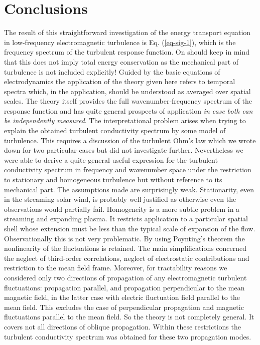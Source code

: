\documentclass[ ]{copernicus2}
\begin{document}
{{{\section{Conclusions}
{The result of this straightforward investigation of the energy transport equation in low-frequency electromagnetic turbulence is Eq. (\ref{eq-sig-1}), which is the frequency spectrum of the turbulent response function. On should keep in mind that this does not imply total energy conservation as the mechanical part of turbulence is not included explicitly! Guided by the basic equations of electrodynamics the application of the theory given here refers to temporal spectra which, in the application, should be understood as averaged over spatial scales. The theory itself provides the full wavenumber-frequency spectrum of the response function and has quite general prospects of application \emph{in case both can be independently measured}. The interpretational problem arises when trying to explain the obtained turbulent conductivity spectrum by some model of turbulence. This requires a discussion of the turbulent Ohm's law which we wrote down for two particular cases but did not investigate further. Nevertheless we were able to derive a quite general useful expression for the turbulent conductivity spectrum in frequency and wavenumber space under the restriction to stationary and homogeneous turbulence but without reference to its mechanical part. The assumptions made are surprisingly weak. Stationarity, even in the streaming solar wind, is probably well justified as otherwise even the observations would partially fail. Homogeneity is a more subtle problem in a streaming and expanding plasma. It restricts application to a particular spatial shell whose extension must be less than the typical scale of expansion of the flow. Observationally this is not very problematic. By using Poynting's theorem the nonlinearity of the fluctuations is retained. The main simplifications concerned the neglect of third-order correlations, neglect of electrostatic contributions and restriction to the mean field frame. Moreover, for tractability reasons we considered only two directions of propagation of any electromagnetic turbulent fluctuations: propagation parallel, and propagation perpendicular to the mean magnetic field, in the latter case with electric fluctuation field parallel to the mean field. This excludes the case of perpendicular propagation and magnetic fluctuations parallel to the mean field. So the theory is not completely general. It covers not all directions of oblique propagation. Within these restrictions the turbulent conductivity spectrum was obtained for these two propagation modes.}  

}}}
\end{document}
